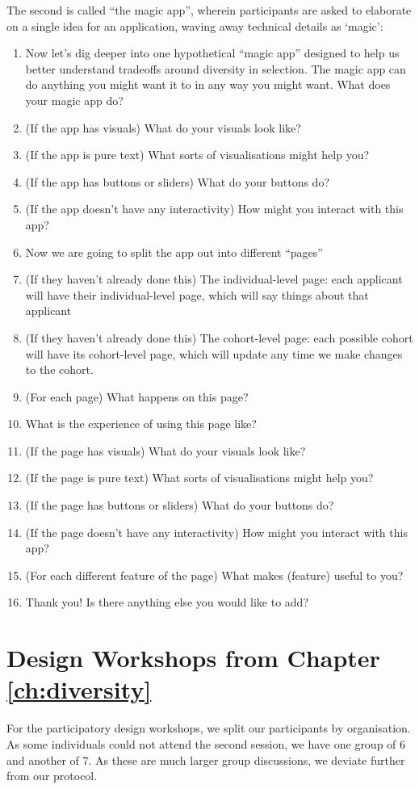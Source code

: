 The second is called ``the magic app'', wherein participants are asked to elaborate on a single idea for an application, waving away technical details as `magic':

\begin{enumerate}
    \item Now let's dig deeper into one hypothetical ``magic app'' designed to help us better understand tradeoffs around diversity in selection. The magic app can do anything you might want it to in any way you might want. What does your magic app do?
    \item (If the app has visuals) What do your visuals look like?
    \item (If the app is pure text) What sorts of visualisations might help you?
    \item (If the app has buttons or sliders) What do your buttons do?
    \item (If the app doesn't have any interactivity) How might you interact with this app?
    \item Now we are going to split the app out into different ``pages''
    \item (If they haven't already done this) The individual-level page: each applicant will have their individual-level page, which will say things about that applicant
    \item (If they haven't already done this) The cohort-level page: each possible cohort will have its cohort-level page, which will update any time we make changes to the cohort.
    \item (For each page) What happens on this page?
    \item What is the experience of using this page like?
    \item (If the page has visuals) What do your visuals look like?
    \item (If the page is pure text) What sorts of visualisations might help you?
    \item (If the page has buttons or sliders) What do your buttons do?
    \item (If the page doesn't have any interactivity) How might you interact with this app?
    \item (For each different feature of the page) What makes (feature) useful to you?
    \item Thank you! Is there anything else you would like to add?
\end{enumerate}

\section{Design Workshops from Chapter \ref{ch:diversity}}\label{app:divprotocol2}
For the participatory design workshops, we split our participants by organisation. As some individuals could not attend the second session, we have one group of 6 and another of 7. As these are much larger group discussions, we deviate further from our protocol.

